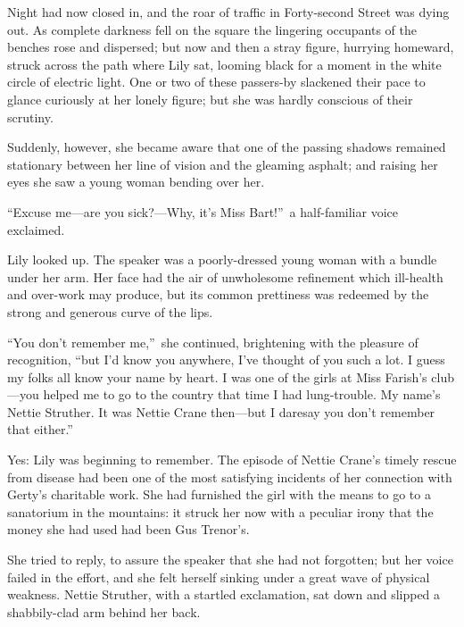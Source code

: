 \documentclass[12pt,a4paper]{book}
\begin{document}
Night had now closed in, and the roar of traffic in Forty-second
Street was dying out. As complete darkness fell on the square the
lingering occupants of the benches rose and dispersed; but now
and then a stray figure, hurrying homeward, struck across the
path where Lily sat, looming black for a moment in the white
circle of electric light. One or two of these passers-by
slackened their pace to glance curiously at her lonely figure;
but she was hardly conscious of their scrutiny.





Suddenly, however, she became aware that one of the passing
shadows remained stationary between her line of vision and the
gleaming asphalt; and raising her eyes she saw a young woman
bending over her.





``Excuse me---are you sick?---Why, it's Miss Bart!''\ a half-familiar
voice exclaimed.





Lily looked up. The speaker was a poorly-dressed young woman with
a bundle under her arm. Her face had the air of unwholesome
refinement which ill-health and over-work may produce, but its
common prettiness was redeemed by the strong and generous curve
of the lips.





``You don't remember me,''\ she continued, brightening with the
pleasure of recognition, ``but I'd know you anywhere, I've thought
of you such a lot. I guess my folks all know your name by heart. 
I was one of the girls at Miss Farish's club---you helped me to go
to the country that time I had lung-trouble. My name's Nettie
Struther. It was Nettie Crane then---but I daresay you don't
remember that either.''





Yes: Lily was beginning to remember. The episode of Nettie
Crane's timely rescue from disease had been one of the most
satisfying incidents of her connection with Gerty's charitable
work. She had furnished the girl with the means to go to a
sanatorium in the mountains: it struck her now with a peculiar
irony that the money she had used had been Gus Trenor's.





She tried to reply, to assure the speaker that she had not
forgotten; but her voice failed in the effort, and she felt
herself sinking under a great wave of physical weakness. Nettie
Struther, with a startled exclamation, sat down and slipped a
shabbily-clad arm behind her back.
\end{document}
